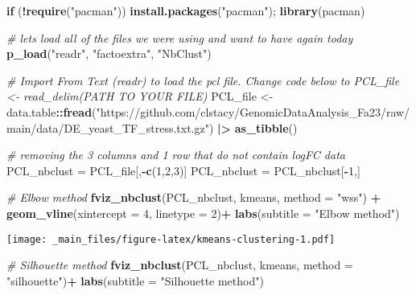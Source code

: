 \documentclass[
]{book}
\newenvironment{Shaded}{\begin{snugshade}}{\end{snugshade}}
\newcommand{\AttributeTok}[1]{\textcolor[rgb]{0.13,0.29,0.53}{#1}}
\newcommand{\CommentTok}[1]{\textcolor[rgb]{0.56,0.35,0.01}{\textit{#1}}}
\newcommand{\ControlFlowTok}[1]{\textcolor[rgb]{0.13,0.29,0.53}{\textbf{#1}}}
\newcommand{\DecValTok}[1]{\textcolor[rgb]{0.00,0.00,0.81}{#1}}
\newcommand{\FunctionTok}[1]{\textcolor[rgb]{0.13,0.29,0.53}{\textbf{#1}}}
\newcommand{\NormalTok}[1]{#1}
\newcommand{\OtherTok}[1]{\textcolor[rgb]{0.56,0.35,0.01}{#1}}
\newcommand{\SpecialCharTok}[1]{\textcolor[rgb]{0.81,0.36,0.00}{\textbf{#1}}}
\newcommand{\StringTok}[1]{\textcolor[rgb]{0.31,0.60,0.02}{#1}}
\begin{document}
\begin{Shaded}
\begin{Highlighting}[]
\ControlFlowTok{if}\NormalTok{ (}\SpecialCharTok{!}\FunctionTok{require}\NormalTok{(}\StringTok{"pacman"}\NormalTok{)) }\FunctionTok{install.packages}\NormalTok{(}\StringTok{"pacman"}\NormalTok{); }\FunctionTok{library}\NormalTok{(pacman)}

\CommentTok{\# let\textquotesingle{}s load all of the files we were using and want to have again today}
\FunctionTok{p\_load}\NormalTok{(}\StringTok{"readr"}\NormalTok{, }\StringTok{"factoextra"}\NormalTok{, }\StringTok{"NbClust"}\NormalTok{) }

\CommentTok{\# Import From Text (readr) to load the pcl file. Change code below to PCL\_file \textless{}{-} read\_delim(PATH TO YOUR FILE)}
\NormalTok{PCL\_file }\OtherTok{\textless{}{-}}\NormalTok{ data.table}\SpecialCharTok{::}\FunctionTok{fread}\NormalTok{(}\StringTok{"https://github.com/clstacy/GenomicDataAnalysis\_Fa23/raw/main/data/DE\_yeast\_TF\_stress.txt.gz"}\NormalTok{) }\SpecialCharTok{|\textgreater{}} \FunctionTok{as\_tibble}\NormalTok{()}

\CommentTok{\# removing the 3 columns and 1 row that do not contain logFC data}
\NormalTok{PCL\_nbclust }\OtherTok{=}\NormalTok{ PCL\_file[,}\SpecialCharTok{{-}}\FunctionTok{c}\NormalTok{(}\DecValTok{1}\NormalTok{,}\DecValTok{2}\NormalTok{,}\DecValTok{3}\NormalTok{)]}
\NormalTok{PCL\_nbclust }\OtherTok{=}\NormalTok{ PCL\_nbclust[}\SpecialCharTok{{-}}\DecValTok{1}\NormalTok{,]}


\CommentTok{\# Elbow method}
\FunctionTok{fviz\_nbclust}\NormalTok{(PCL\_nbclust, kmeans, }\AttributeTok{method =} \StringTok{"wss"}\NormalTok{) }\SpecialCharTok{+}
    \FunctionTok{geom\_vline}\NormalTok{(}\AttributeTok{xintercept =} \DecValTok{4}\NormalTok{, }\AttributeTok{linetype =} \DecValTok{2}\NormalTok{)}\SpecialCharTok{+}
  \FunctionTok{labs}\NormalTok{(}\AttributeTok{subtitle =} \StringTok{"Elbow method"}\NormalTok{)}
\end{Highlighting}
\end{Shaded}

\texttt{[image: \_main\_files/figure-latex/kmeans-clustering-1.pdf]}

\begin{Shaded}
\begin{Highlighting}[]
\CommentTok{\# Silhouette method}
\FunctionTok{fviz\_nbclust}\NormalTok{(PCL\_nbclust, kmeans, }\AttributeTok{method =} \StringTok{"silhouette"}\NormalTok{)}\SpecialCharTok{+}
  \FunctionTok{labs}\NormalTok{(}\AttributeTok{subtitle =} \StringTok{"Silhouette method"}\NormalTok{)}
\end{Highlighting}
\end{Shaded}
\end{document}

